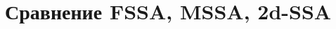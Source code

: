 \documentclass[12pt, specialist, subf
]{disser}
\theoremstyle{definition}
\newcommand{\SSA}{\texttt{SSA}}
\newcommand{\MSSA}{\texttt{MSSA}}
\newcommand{\DSSA}{\texttt{2d-SSA}}
\newcommand{\TS}{\mathsf{X}}
\begin{document}
















\section{Сравнение FSSA, MSSA, 2d-SSA}
\end{document}
